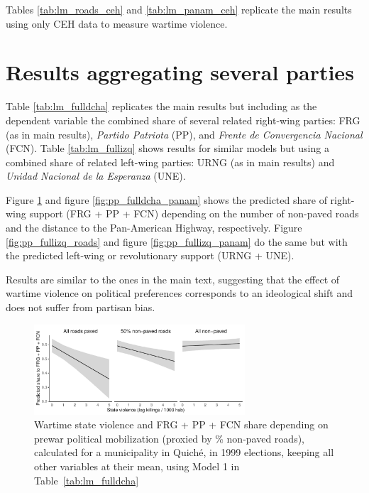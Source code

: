 \documentclass[a4paper, 12pt, notitlepage]{article}
\begin{document}
Tables \ref{tab:lm_roads_ceh} and \ref{tab:lm_panam_ceh} replicate the main results using only CEH data to measure wartime violence.




\clearpage
\section{Results aggregating several parties}\label{app:results_full}

Table \ref{tab:lm_fulldcha} replicates the main results but including as the dependent variable the combined share of several related right-wing parties: FRG (as in main results), \textit{Partido Patriota} (PP), and \textit{Frente de Convergencia Nacional} (FCN).
Table \ref{tab:lm_fullizq} shows results for similar models but using a combined share of related left-wing parties: URNG (as in main results) and \textit{Unidad Nacional de la Esperanza} (UNE).

Figure \ref{fig:pp_fulldcha_roads} and figure \ref{fig:pp_fulldcha_panam} shows the predicted share of right-wing support (FRG + PP + FCN) depending on the number of non-paved roads and the distance to the Pan-American Highway, respectively.
Figure \ref{fig:pp_fullizq_roads} and figure \ref{fig:pp_fullizq_panam} do the same but with the predicted left-wing or revolutionary support (URNG + UNE).

Results are similar to the ones in the main text, suggesting that the effect of wartime violence on political preferences corresponds to an ideological shift and does not suffer from partisan bias.




\clearpage
\begin{figure}[htb!]
  \centering
    \includegraphics[width = 0.7\textwidth]{img/pp_fulldcha_roads}

  \caption{Wartime state violence and FRG + PP + FCN share depending on prewar political mobilization (proxied by \% non-paved roads), calculated for a municipality in Quiché, in 1999 elections, keeping all other variables at their mean, using Model 1 in Table~\ref{tab:lm_fulldcha}} \label{fig:pp_fulldcha_roads}

\end{figure}
\end{document}
